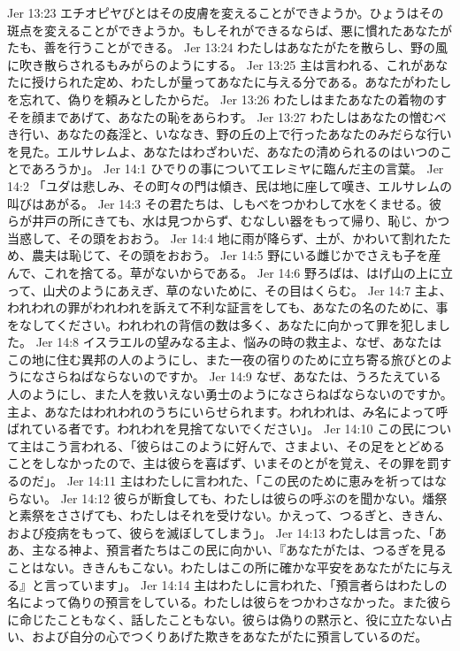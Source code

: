 Jer 13:23  エチオピヤびとはその皮膚を変えることができようか。ひょうはその斑点を変えることができようか。もしそれができるならば、悪に慣れたあなたがたも、善を行うことができる。
Jer 13:24  わたしはあなたがたを散らし、野の風に吹き散らされるもみがらのようにする。
Jer 13:25  主は言われる、これがあなたに授けられた定め、わたしが量ってあなたに与える分である。あなたがわたしを忘れて、偽りを頼みとしたからだ。
Jer 13:26  わたしはまたあなたの着物のすそを顔まであげて、あなたの恥をあらわす。
Jer 13:27  わたしはあなたの憎むべき行い、あなたの姦淫と、いななき、野の丘の上で行ったあなたのみだらな行いを見た。エルサレムよ、あなたはわざわいだ、あなたの清められるのはいつのことであろうか」。
Jer 14:1  ひでりの事についてエレミヤに臨んだ主の言葉。
Jer 14:2  「ユダは悲しみ、その町々の門は傾き、民は地に座して嘆き、エルサレムの叫びはあがる。
Jer 14:3  その君たちは、しもべをつかわして水をくませる。彼らが井戸の所にきても、水は見つからず、むなしい器をもって帰り、恥じ、かつ当惑して、その頭をおおう。
Jer 14:4  地に雨が降らず、土が、かわいて割れたため、農夫は恥じて、その頭をおおう。
Jer 14:5  野にいる雌じかでさえも子を産んで、これを捨てる。草がないからである。
Jer 14:6  野ろばは、はげ山の上に立って、山犬のようにあえぎ、草のないために、その目はくらむ。
Jer 14:7  主よ、われわれの罪がわれわれを訴えて不利な証言をしても、あなたの名のために、事をなしてください。われわれの背信の数は多く、あなたに向かって罪を犯しました。
Jer 14:8  イスラエルの望みなる主よ、悩みの時の救主よ、なぜ、あなたはこの地に住む異邦の人のようにし、また一夜の宿りのために立ち寄る旅びとのようになさらねばならないのですか。
Jer 14:9  なぜ、あなたは、うろたえている人のようにし、また人を救いえない勇士のようになさらねばならないのですか。主よ、あなたはわれわれのうちにいらせられます。われわれは、み名によって呼ばれている者です。われわれを見捨てないでください」。
Jer 14:10  この民について主はこう言われる、「彼らはこのように好んで、さまよい、その足をとどめることをしなかったので、主は彼らを喜ばず、いまそのとがを覚え、その罪を罰するのだ」。
Jer 14:11  主はわたしに言われた、「この民のために恵みを祈ってはならない。
Jer 14:12  彼らが断食しても、わたしは彼らの呼ぶのを聞かない。燔祭と素祭をささげても、わたしはそれを受けない。かえって、つるぎと、ききん、および疫病をもって、彼らを滅ぼしてしまう」。
Jer 14:13  わたしは言った、「ああ、主なる神よ、預言者たちはこの民に向かい、『あなたがたは、つるぎを見ることはない。ききんもこない。わたしはこの所に確かな平安をあなたがたに与える』と言っています」。
Jer 14:14  主はわたしに言われた、「預言者らはわたしの名によって偽りの預言をしている。わたしは彼らをつかわさなかった。また彼らに命じたこともなく、話したこともない。彼らは偽りの黙示と、役に立たない占い、および自分の心でつくりあげた欺きをあなたがたに預言しているのだ。
